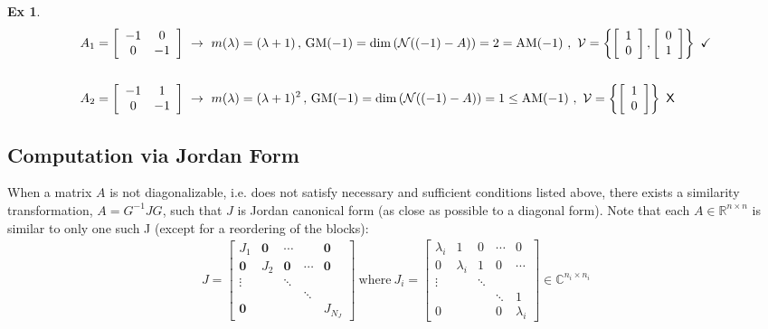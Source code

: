 \documentclass[twoside]{article}
\newtheorem{exmp}[theorem]{Ex}
\begin{document}
\begin{exmp}
\begin{align*}
A_1 &=   \left[ \begin{array}{cc} -1 & 0  \\ 0 & -1 \end{array} \right] \ \rightarrow  \ m(\lambda) = (\lambda + 1) \, , \, 
\mathrm{GM}(-1) = \mathrm{dim}\left( \mathcal{N}((-1) - A) \right) = 2 = \mathrm{AM}(-1) \ , \  \mathcal{V} = \left\lbrace  \left[ \begin{array}{c} 1 \\ 0  \end{array} \right] ,   \left[ \begin{array}{c} 0  \\ 1  \end{array} \right]  \right\rbrace \ \checkmark
\\
\\
A_2 &=   \left[ \begin{array}{cc} -1 & 1  \\ 0 & -1 \end{array} \right] \ \rightarrow \ m(\lambda) = (\lambda + 1)^2 \, , \, 
\mathrm{GM}(-1) = \mathrm{dim}\left( \mathcal{N}((-1) - A) \right) = 1 \leq \mathrm{AM}(-1) \ , \  \mathcal{V} = \left\lbrace  \left[ \begin{array}{c} 1 \\ 0  \end{array} \right]  \right\rbrace \ \text{\sffamily X}
\end{align*}
\end{exmp}

\subsection{Computation via Jordan Form}

When a matrix $A$ is not diagonalizable, i.e. does not satisfy necessary and sufficient conditions listed above, there exists a similarity transformation, $A = G^{-1} J G$, such that $J$  
is Jordan canonical form (as close as possible to a diagonal form). Note that each $A \in \mathbb{R}^{n \times n}$ is similar to only one such J (except for a reordering of the blocks):
%
\begin{align*}
J = \left[  \begin{array}{ccccc} J_1 & \mathbf{0} & \cdots & & \mathbf{0} \\ \mathbf{0} & J_2 & \mathbf{0} & \cdots & \mathbf{0} \\ \vdots &  & \ddots &  \\ & & & \ddots &  \\
\mathbf{0} &  &  &  & J_{N_J} \end{array} \right] \ \mathrm{where} \ 
J_i = \left[  \begin{array}{ccccc} \lambda_i & 1 & 0 & \cdots & 0  \\ 0 & \lambda_i & 1 & 0 & \cdots  \\ 
\vdots &  & \ddots &  \\ & & & \ddots & 1 \\
0 &  &  & 0 & \lambda_i \end{array} \right]  \in \mathbb{C}^{n_i \times n_i}
\end{align*}
\end{document}
